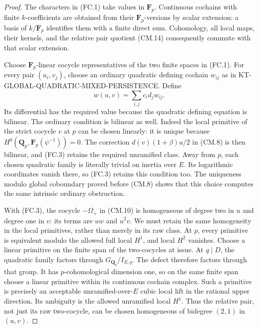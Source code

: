 \documentclass[11pt,a4paper]{article}
\theoremstyle{definition}
\begin{document}
\begin{proof}
The characters in (FC.1) take values in \(\mathbf F_p\).
Continuous cochains with finite \(k\)-coefficients
are obtained from their \(\mathbf F_p\)-versions
by scalar extension: a basis of \(k/\mathbf F_p\)
identifies them with a finite direct sum.
Cohomology, all local maps, their kernels, and the
relative pair quotient (CM.14) consequently commute
with that scalar extension.

Choose \(\mathbf F_p\)-linear cocycle representatives
of the two finite spaces in (FC.1).
For every pair \((u_i,v_j)\), choose an ordinary
quadratic defining cochain \(w_{ij}\) as in
KT-GLOBAL-QUADRATIC-MIXED-PERSISTENCE.  Define
\[
                 w(u,v)=\sum_{i,j}c_i d_j w_{ij}.
                                                        \tag{FC.3}
\]
Its differential has the required value because
the quadratic defining equation is bilinear.
The ordinary condition is bilinear as well.
Indeed the local primitive of the strict cocycle
\(v\) at \(p\) can be chosen linearly: it is unique
because \(H^0(\mathbf Q_p,\mathbf F_p(\psi^{-1}))=0\).
The correction \(d(v)(1+\beta)u/2\) in (CM.8)
is then bilinear, and (FC.3) retains the required
unramified class.  Away from \(p\), each chosen
quadratic family is literally trivial on inertia
over \(E\).  Its logarithmic coordinates vanish
there, so (FC.3) retains this condition too.
The uniqueness modulo global coboundary proved
before (CM.8) shows that this choice computes
the same intrinsic ordinary obstruction.

With (FC.3), the cocycle \(-\Omega_+\) in (CM.10)
is homogeneous of degree two in \(u\) and degree
one in \(v\): its terms are \(uw\) and \(u^2v\).
We must retain the same homogeneity in the local
primitives, rather than merely in its raw class.
At \(p\), every primitive is equivalent modulo
the allowed full local \(H^1\), and local \(H^2\)
vanishes.  Choose a linear primitive on the
finite span of the two-cocycles at issue.
At \(q\mid D\), the quadratic family factors
through \(G_{\mathbf Q_q}/I_{E,q}\).
The defect therefore factors through that group.
It has \(p\)-cohomological dimension one, so on
the same finite span choose a linear primitive
within its continuous cochain complex.
Such a primitive is precisely an acceptable
unramified-over-\(E\) cubic local lift in the
rational upper direction.  Its ambiguity is
the allowed unramified local \(H^1\).
Thus the relative pair, not just its raw
two-cocycle, can be chosen homogeneous of
bidegree \((2,1)\) in \((u,v)\).


\end{proof}
\end{document}
